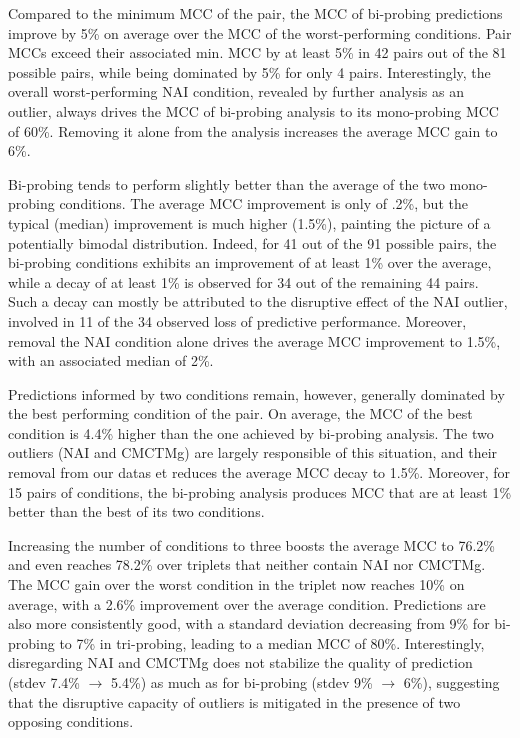 \documentclass[a4,center,fleqn]{NAR}
\begin{document}
Compared to the minimum MCC of the pair, the MCC of bi-probing predictions improve by 5\% on average over the MCC of the worst-performing conditions. Pair MCCs exceed their associated min. MCC by at least 5\% in 42 pairs out of the 81 possible pairs, while being dominated by 5\% for only 4 pairs. Interestingly, the overall worst-performing NAI condition, revealed by further analysis as an outlier, always drives the MCC of bi-probing analysis to its mono-probing MCC of 60\%. Removing it alone from the analysis increases the average MCC gain to 6\%.

Bi-probing tends to perform slightly better than the average of the two mono-probing conditions. The average MCC improvement is only of .2\%, but the typical (median) improvement is much higher (1.5\%), painting the picture of a potentially bimodal distribution. Indeed, for 41 out of the 91 possible pairs, the bi-probing conditions exhibits an improvement of at least 1\% over the average, while a decay of at least 1\% is observed for 34 out of the remaining 44 pairs. Such a decay can mostly be attributed to the disruptive effect of the NAI outlier, involved in 11 of the 34 observed loss of predictive performance. Moreover, removal the NAI condition alone drives the average MCC improvement to 1.5\%, with an associated median of 2\%.

Predictions informed by two conditions remain, however, generally dominated by the best performing condition of the pair. On average, the MCC of the best condition is 4.4\% higher than the one achieved by bi-probing analysis. 
The two outliers (NAI and CMCTMg) are largely responsible of this situation, and their removal from our datas et reduces the average MCC decay to 1.5\%. Moreover, for 15 pairs of conditions, the bi-probing analysis produces MCC that are at least 1\% better than the best of its two conditions.

Increasing the number of conditions to three boosts the average MCC to 76.2\% and even reaches 78.2\% over triplets that neither contain NAI nor CMCTMg. The MCC gain over the worst condition in the triplet now reaches 10\% on average, with a 2.6\% improvement over the average condition.  Predictions are also more consistently good, with a standard deviation decreasing from 9\% for bi-probing to 7\% in tri-probing, leading to a median MCC of 80\%. Interestingly, disregarding NAI and CMCTMg does not stabilize the quality of prediction (stdev 7.4\% $\to$ 5.4\%) as much as for bi-probing (stdev 9\% $\to$ 6\%), suggesting that the disruptive capacity of outliers is mitigated in the presence of two opposing conditions.
\end{document}
